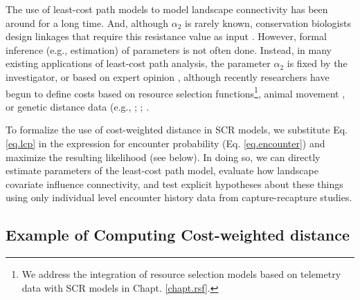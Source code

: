 The use of least-cost path models to model landscape connectivity has
been around for a long time. And, although $\alpha_{2}$ is rarely
known, conservation biologists design linkages that require this
resistance value as input \citep[see][and articles cited
therein]{beier_etal:2008}.  However, formal inference (e.g.,
estimation) of parameters is not often done.  Instead, in many
existing applications of least-cost path analysis, the parameter
$\alpha_{2}$ is fixed by the investigator, or based on expert opinion
\citep{beier_etal:2008}, although recently researchers have begun to
define costs based on resource selection functions\footnote{We address the integration of resource
selection models based on telemetry data with SCR models in
Chapt. \ref{chapt.rsf}.},
animal movement
\citep{tracy:2006, fortin_etal:2005}, or genetic distance data (e.g.,
\citet{gerlach_musolf:2000}; \citet{epps_etal:2007};
\citet{schwartz_etal:2009}. 


To formalize the use of cost-weighted distance in SCR models, we
substitute Eq. \ref{eq.lcp} in the expression for encounter
probability (Eq. \ref{eq.encounter}) and maximize the resulting
likelihood (see  below). In doing so, we can directly
estimate parameters of the least-cost path model, evaluate how
landscape covariate influence connectivity, and test explicit hypotheses
about these things using only individual level encounter history data
from capture-recapture studies.


\subsection{Example of Computing Cost-weighted distance}

